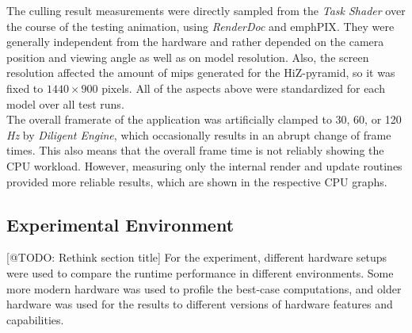 \noindent
The culling result measurements were directly sampled from the \emph{Task Shader} over the course of the testing 
animation, using \emph{RenderDoc} and emph{PIX}. They were generally independent from the hardware and rather 
depended on the camera position and viewing angle as well as on model resolution. Also, the screen resolution 
affected the amount of mips generated for the \ac{HiZ}-pyramid, so it was fixed to $1440 \times 900$ pixels. 
All of the aspects above were standardized for each model over all test runs.\\

\noindent 
The overall framerate of the application was artificially clamped to 30, 60, or 120 \emph{Hz} by \emph{Diligent Engine}, 
which occasionally results in an abrupt change of frame times. This also means that the overall frame time is not 
reliably showing the \ac{CPU} workload. However, measuring only the internal render and update routines provided 
more reliable results, which are shown in the respective \ac{CPU} graphs. 


\subsection*{Experimental Environment} \label{subsec-experimental-environment}

[@TODO: Rethink section title]
For the experiment, different hardware setups were used to compare the runtime performance in different environments.
Some more modern hardware was used to profile the best-case computations, and older hardware was used for the results 
to different versions of hardware features and capabilities.

